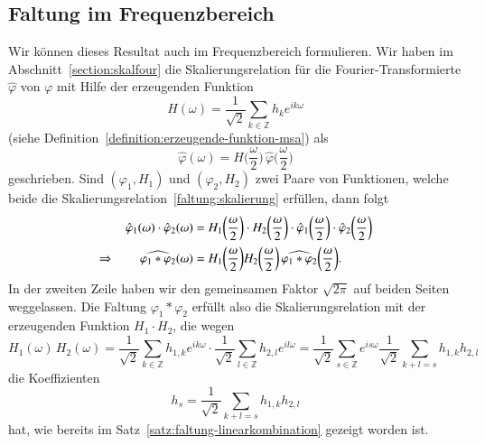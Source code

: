 \subsection{Faltung im Frequenzbereich
\label{subsection:faltung-im-frequenzbereich}}
Wir können dieses Resultat auch im Frequenzbereich formulieren.
Wir haben im Abschnitt~\ref{section:skalfour} die Skalierungsrelation
für die Fourier-Transformierte $\hat{\varphi}$ von $\varphi$ mit Hilfe
der erzeugenden Funktion
\[
H(\omega)
=
\frac{1}{\sqrt{2}}
\sum_{k\in\mathbb Z} h_ke^{ik\omega}
\]
(siehe Definition~\ref{definition:erzeugende-funktion-msa})
als
\begin{equation}
\hat{\varphi}(\omega)
=
H\biggl(\frac{\omega}2\biggr)
\,
\hat{\varphi}\biggl(\frac{\omega}2\biggr)
\label{faltung:skalierung}
\end{equation}
geschrieben.
Sind
$(\varphi_1,H_1)$ und $(\varphi_2,H_2)$ zwei Paare von Funktionen,
welche beide die Skalierungsrelation~\eqref{faltung:skalierung} erfüllen,
dann folgt
\begin{align*}
\hat{\varphi}_1(\omega)
\cdot
\hat{\varphi}_2(\omega)
&=
H_1\biggl(\frac{\omega}2\biggr)
\cdot
H_2\biggl(\frac{\omega}2\biggr)
\cdot
\hat{\varphi}_1\biggl(\frac{\omega}2\biggr)
\cdot
\hat{\varphi}_2\biggl(\frac{\omega}2\biggr)
\\
\Rightarrow\qquad
\widehat{\mathstrut\varphi_1*\varphi_2}(\omega)
&=
H_1\biggl(\frac{\omega}2\biggr)
H_2\biggl(\frac{\omega}2\biggr)
\,
\widehat{\mathstrut\varphi_1*\varphi_2}\biggl(\frac{\omega}2\biggr).
\end{align*}
In der zweiten Zeile haben wir den gemeinsamen Faktor $\sqrt{2\pi}$
auf beiden Seiten weggelassen.
Die Faltung $\varphi_1*\varphi_2$ erfüllt also die Skalierungsrelation
mit der erzeugenden Funktion $H_1\cdot H_2$, die wegen
\[
H_1(\omega)\,H_2(\omega)
=
\frac{1}{\sqrt{2}}
\sum_{k\in\mathbb Z} h_{1,k}e^{ik\omega}
\cdot
\frac{1}{\sqrt{2}}
\sum_{l\in\mathbb Z} h_{2,l}e^{il\omega}
=
\frac{1}{\sqrt{2}}
\sum_{s\in\mathbb Z} e^{is\omega}
\frac{1}{\sqrt{2}}
\sum_{k+l=s}h_{1,k}h_{2,l}
\]
die Koeffizienten
\[
h_s = \frac{1}{\sqrt{2}}\sum_{k+l=s} h_{1,k}h_{2,l}
\]
hat,
wie bereits im Satz~\ref{satz:faltung-linearkombination} gezeigt worden ist.

